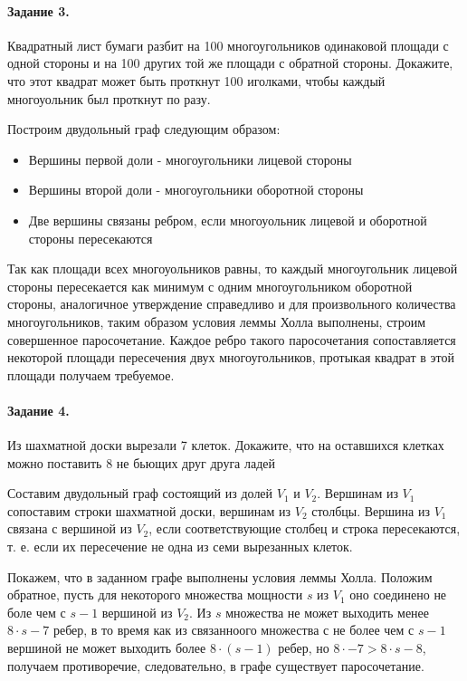 \documentclass[a4paper,12pt]{article}
\begin{document}
\paragraph{Задание 3.} Квадратный лист бумаги разбит на 100 многоугольников одинаковой площади с одной стороны и на 100 других той же площади с обратной стороны. Докажите, что этот квадрат может быть проткнут 100 иголками, чтобы каждый многоуольник был проткнут по разу.
\begin{Solution}
Построим двудольный граф следующим образом:
\begin{itemize}
\item Вершины первой доли - многоугольники лицевой стороны

\item Вершины второй доли - многоугольники оборотной стороны

\item Две вершины связаны ребром, если многоуольник лицевой и оборотной стороны пересекаются
\end{itemize}
Так как площади всех многоуольников равны, то каждый многоугольник лицевой стороны пересекается как минимум с одним многоугольником оборотной стороны, аналогичное утверждение справедливо и для произвольного количества многоугольников, таким образом условия леммы Холла выполнены, строим совершенное паросочетание. Каждое ребро такого паросочетания сопоставляется некоторой площади пересечения двух многоугольников, протыкая квадрат в этой площади получаем требуемое.
\end{Solution}

\paragraph{Задание 4. } Из шахматной доски вырезали 7 клеток. Докажите, что на оставшихся клетках можно поставить 8 не бьющих друг друга ладей

\begin{Solution}
Составим двудольный граф состоящий из долей $V_1$ и $V_2$. Вершинам из $V_1$ сопоставим строки шахматной доски, вершинам из $V_2$ столбцы. Вершина из $V_1$ связана с вершиной из $V_2$, если соответствующие столбец и строка пересекаются, т. е. если их пересечение не одна из семи вырезанных клеток.

Покажем, что в заданном графе выполнены условия леммы Холла. Положим обратное, пусть для некоторого множества мощности $s$ из $V_1$ оно соединено не боле чем с $s-1$ вершиной из $V_2$. Из $s$ множества не может выходить менее $8\cdot s - 7$ ребер, в то время как из связанноого множества с не более чем с $s-1$ вершиной не может выходить более $8\cdot(s-1)$ ребер, но $8 \cdot - 7 > 8 \cdot s - 8$, получаем противоречие, следовательно, в графе существует паросочетание.
\end{Solution}
\end{document}
